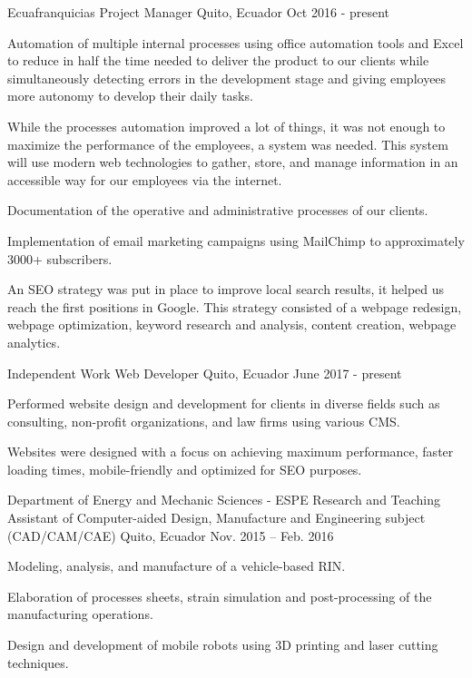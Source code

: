 
\begin{cventries}

  \cventry
    {Ecuafranquicias}
    {Project Manager}
    {Quito, Ecuador}
    {Oct 2016 - present}
    {
      \begin{cvitems}
        \item {Automation of multiple internal processes using oﬀice automation tools and Excel to reduce in half the time needed to deliver the product to our clients while simultaneously detecting errors in the development stage and giving employees more autonomy to develop their daily tasks.}
        \item {While the processes automation improved a lot of things, it was not enough to maximize the performance of the employees, a system was needed. This system will use modern web technologies to gather, store, and manage information in an accessible way for our employees via the internet.}
        \item {Documentation of the operative and administrative processes of our clients.}
        \item {Implementation of email marketing campaigns using MailChimp to approximately 3000+ subscribers.}
        \item {An SEO strategy was put in place to improve local search results, it helped us reach the first positions in Google. This strategy consisted of a webpage redesign, webpage optimization, keyword research and analysis, content creation, webpage analytics.}
      \end{cvitems}
    }

    \cventry
      {Independent Work}
      {Web Developer}
      {Quito, Ecuador}
      {June 2017 - present}
      {
        \begin{cvitems}
          \item {Performed website design and development for clients in diverse fields such as consulting, non-profit organizations, and law firms using various CMS.}
          \item {Websites were designed with a focus on achieving maximum performance, faster loading times, mobile-friendly and optimized for SEO purposes.}
        \end{cvitems}
      }

  \cventry
    {Department of Energy and Mechanic Sciences - ESPE}
    {Research and Teaching Assistant of Computer-aided Design, Manufacture and Engineering subject (CAD/CAM/CAE)	}
    {Quito, Ecuador}
    {Nov. 2015 – Feb. 2016}
    {
      \begin{cvitems}
        \item {Modeling, analysis, and manufacture of a vehicle-based RIN.}
        \item {Elaboration of processes sheets, strain simulation and post-processing of the manufacturing operations.}
        \item {Design and development of mobile robots using 3D printing and laser cutting techniques.}
      \end{cvitems}
    }


\end{cventries}

